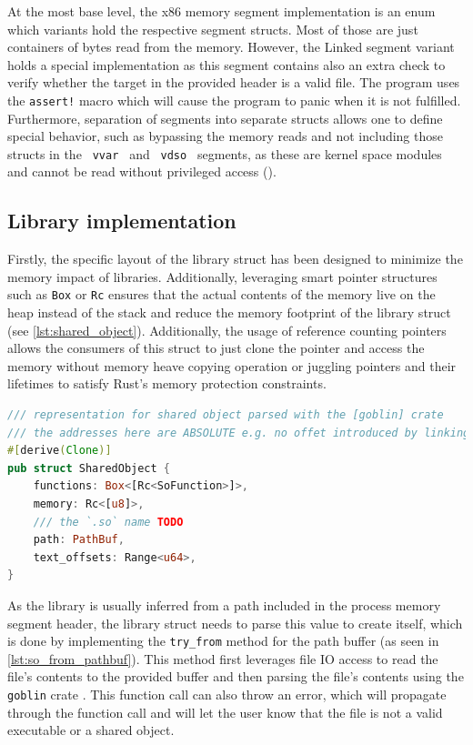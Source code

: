 At the most base level, the x86 memory segment implementation is an enum which variants hold the respective segment structs. Most of those are just containers of bytes read from the memory.
However, the Linked segment variant holds a special implementation as this segment contains also an extra check to verify whether the target in the provided header is a valid file.
The program uses the \verb|assert!| macro which will cause the program to panic when it is not fulfilled.
Furthermore, separation of segments into separate structs allows one to define special behavior, such as bypassing the memory reads and not including those structs in the \verb| vvar | and \verb| vdso | segments, as these are kernel space modules and cannot be read without privileged access (\cite{kerrisk_vdso7_2024}).

\subsection{Library implementation}

Firstly, the specific layout of the library struct has been designed to minimize the memory impact of libraries.
Additionally, leveraging smart pointer structures such as \verb|Box| or \verb|Rc| ensures that the actual contents of the memory live on the heap instead of the stack and reduce the memory footprint of the library struct (see \autoref{lst:shared_object}).
Additionally, the usage of reference counting pointers allows the consumers of this struct to just clone the pointer and access the memory without memory heave copying operation or juggling pointers and their lifetimes to satisfy Rust's memory protection constraints.

\begin{lstlisting}[caption=\label{lst:shared_object}{The x86 shared object representation}, language=Rust]
/// representation for shared object parsed with the [goblin] crate
/// the addresses here are ABSOLUTE e.g. no offet introduced by linking
#[derive(Clone)]
pub struct SharedObject {
    functions: Box<[Rc<SoFunction>]>,
    memory: Rc<[u8]>,
    /// the `.so` name TODO
    path: PathBuf,
    text_offsets: Range<u64>,
}
\end{lstlisting}

As the library is usually inferred from a path included in the process memory segment header, the library struct needs to parse this value to create itself, which is done by implementing the \verb|try_from| method for the path buffer (as seen in \autoref{lst:so_from_pathbuf}).
This method first leverages file IO access to read the file's contents to the provided buffer and then parsing the file's contents using the \verb|goblin| crate \cite{m4b_m4bgoblin_2024}.
This function call can also throw an error, which will propagate through the function call and will let the user know that the file is not a valid executable or a shared object.

